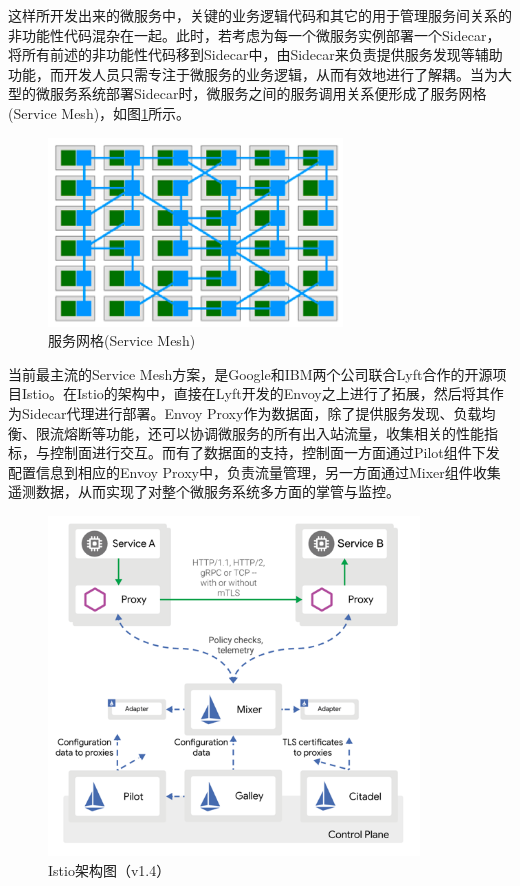 \documentclass[a4paper, 12pt]{article}
\theoremstyle{definition}
\begin{document}
这样所开发出来的微服务中，关键的业务逻辑代码和其它的用于管理服务间关系的非功能性代码混杂在一起。此时，若考虑为每一个微服务实例部署一个Sidecar，将所有前述的非功能性代码移到Sidecar中，由Sidecar来负责提供服务发现等辅助功能，而开发人员只需专注于微服务的业务逻辑，从而有效地进行了解耦。当为大型的微服务系统部署Sidecar时，微服务之间的服务调用关系便形成了服务网格(Service Mesh)，如图\ref{fig:service_mesh}所示。
\begin{figure}[!ht]
 \centering
 \includegraphics[height=5cm]{images/service_mesh.png}
 \caption{服务网格(Service Mesh)}
 \label{fig:service_mesh}
\end{figure}

当前最主流的Service Mesh方案，是Google和IBM两个公司联合Lyft合作的开源项目Istio\cite{istio}。在Istio的架构中，直接在Lyft开发的Envoy之上进行了拓展，然后将其作为Sidecar代理进行部署。Envoy Proxy作为数据面，除了提供服务发现、负载均衡、限流熔断等功能，还可以协调微服务的所有出入站流量，收集相关的性能指标，与控制面进行交互。而有了数据面的支持，控制面一方面通过Pilot组件下发配置信息到相应的Envoy Proxy中，负责流量管理，另一方面通过Mixer组件收集遥测数据，从而实现了对整个微服务系统多方面的掌管与监控。
\begin{figure}[!ht]
 \centering
 \includegraphics[height=9cm]{images/istio_arch.png}
 \caption{Istio架构图（v1.4）}
 \label{fig:istio_arch}
\end{figure}
\end{document}

